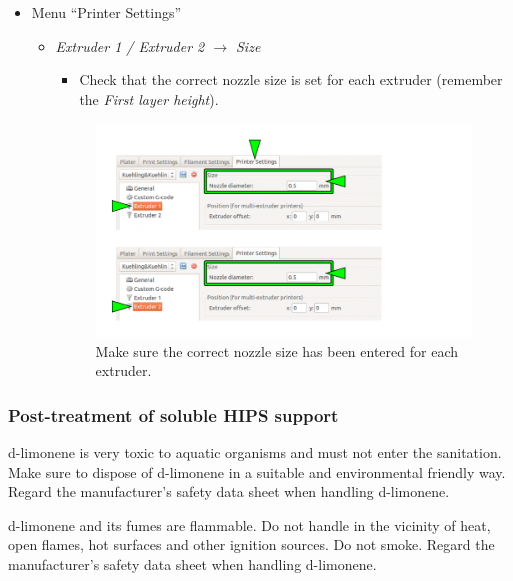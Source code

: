 \begin{itemize}
  \item Menu “Printer Settings”
  
  \begin{itemize}
    \item \emph{Extruder 1 / Extruder 2 $\rightarrow$ Size} 

        \begin{itemize}
          \item Check that the correct nozzle size is set for each extruder 
               (remember the \emph{First layer height}). 
        \end{itemize}


      \begin{figure}[H]
        \centering
        \includegraphics[width=.7\linewidth]{./img/slic3r_multipleextr_e1e2.png}
        \caption{Make sure the correct nozzle size has been entered for each extruder.}
      \end{figure}

  \end{itemize}

\end{itemize}

\subsubsection{Post-treatment of soluble HIPS support}

\begin{danger}
  d-limonene is very toxic to aquatic organisms and must not enter the sanitation.
  Make sure to dispose of d-limonene in a suitable and environmental friendly way.
  Regard the manufacturer's safety data sheet when handling d-limonene. 
\end{danger}

\begin{danger}
  d-limonene and its fumes are flammable.
  Do not handle in the vicinity of heat, open flames, hot surfaces and other ignition sources.
  Do not smoke.
  Regard the manufacturer's safety data sheet when handling d-limonene. 
\end{danger}


